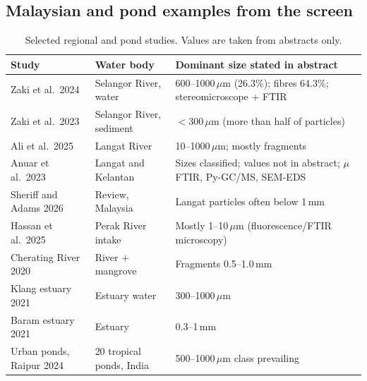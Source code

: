 \documentclass[11pt,a4paper]{article}
\newcommand{\um}{\,\ensuremath{\mu}m}
\begin{document}
\subsection{Malaysian and pond examples from the screen}
\begin{table}[H]\centering\small
\begin{tabularx}{\textwidth}{@{}p{3.6cm}p{3.8cm}X@{}}
\toprule Study & Water body & Dominant size stated in abstract \\\midrule
Zaki et al.\ 2024 \cite{zaki24} & Selangor River, water & 600--1000\um{} (26.3\%); fibres 64.3\%; stereomicroscope + FTIR \\
Zaki et al.\ 2023 \cite{zaki23} & Selangor River, sediment & $<$300\um{} (more than half of particles) \\
Ali et al.\ 2025 \cite{ali25} & Langat River & 10--1000\um{}; mostly fragments \\
Anuar et al.\ 2023 \cite{anuar23} & Langat and Kelantan & Sizes classified; values not in abstract; $\mu$FTIR, Py-GC/MS, SEM-EDS \\
Sheriff and Adams 2026 \cite{sheriff26} & Review, Malaysia & Langat particles often below 1\,mm \\
Hassan et al.\ 2025 \cite{hassan25} & Perak River intake & Mostly 1--10\um{} (fluorescence/FTIR microscopy) \\
Cherating River 2020 \cite{cherating20} & River + mangrove & Fragments 0.5--1.0\,mm \\
Klang estuary 2021 \cite{klang21} & Estuary water & 300--1000\um{} \\
Baram estuary 2021 \cite{baram21} & Estuary & 0.3--1\,mm \\
Urban ponds, Raipur 2024 \cite{raipur24} & 20 tropical ponds, India & 500--1000\um{} class prevailing \\
\bottomrule\end{tabularx}
\caption{Selected regional and pond studies. Values are taken from abstracts only.}
\end{table}
\end{document}
